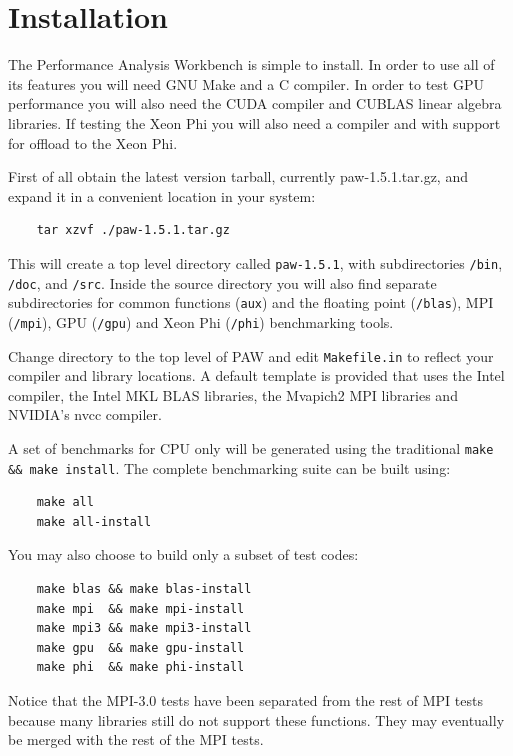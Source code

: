 \documentclass[10pt,a4paper]{report}
\begin{document}
\tableofcontents

\chapter{Installation}
The Performance Analysis Workbench is simple to install. In order to use all of its features you will need GNU Make and a C compiler. In order to test GPU performance you will also need the CUDA compiler and CUBLAS linear algebra libraries. If testing the Xeon Phi you will also need a compiler and with support for offload to the Xeon Phi.

First of all obtain the latest version tarball, currently paw-1.5.1.tar.gz, and expand it in a convenient location in your system:

\begin{verbatim}
    tar xzvf ./paw-1.5.1.tar.gz
\end{verbatim}

This will create a top level directory called \verb+paw-1.5.1+, with subdirectories \verb+/bin+, \verb+/doc+, and \verb+/src+. Inside the source directory you will also find separate subdirectories for common functions (\verb+aux+) and the floating point (\verb+/blas+), MPI (\verb+/mpi+), GPU (\verb+/gpu+) and Xeon Phi (\verb+/phi+) benchmarking tools.

Change directory to the top level of PAW and edit \verb+Makefile.in+ to reflect your compiler and library locations. A default template is provided that uses the Intel compiler, the Intel MKL BLAS libraries, the Mvapich2 MPI libraries and NVIDIA's nvcc compiler.

A set of benchmarks for CPU only will be generated using the traditional \texttt{make \&\& make install}. The complete benchmarking suite can be built using:

\begin{verbatim}
    make all
    make all-install
\end{verbatim}

You may also choose to build only a subset of test codes:

\begin{verbatim}
    make blas && make blas-install
    make mpi  && make mpi-install
    make mpi3 && make mpi3-install
    make gpu  && make gpu-install
    make phi  && make phi-install
\end{verbatim}

Notice that the MPI-3.0 tests have been separated from the rest of MPI tests because many libraries still do not support these functions. They may eventually be merged with the rest of the MPI tests.
\end{document}

